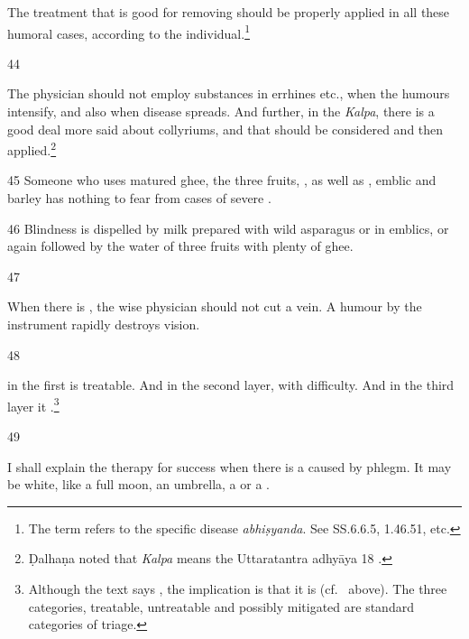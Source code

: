 \begin{translation}
    The treatment that is good for removing  should be 
    properly
    applied in all these humoral cases, according to the individual.\footnote{The term
     refers to the specific disease \emph{abhiṣyanda}.  See
    SS.6.6.5, 1.46.51, etc.}
    
    \item[44] %
    
    The physician should not employ substances in errhines etc., when the humours intensify, 
    and also when disease spreads.  And further, in the \emph{Kalpa}, there is a good deal 
    more 
    said about collyriums, and that should be considered and then applied.\footnote{Ḍalhaṇa 
    noted that \emph{Kalpa} means the Uttaratantra adhyāya 18 
    \citep[633\,ff]{vulgate}.}
    
    \item[45] 
    Someone who uses matured ghee, the three fruits, , 
    as well as
    , emblic and barley
    has nothing to fear from cases of severe .
    
    \item[46] Blindness is dispelled by milk prepared with wild asparagus or in
    emblics, or again  followed by the water of three
    fruits with plenty of ghee.
    
    \item[47]
    
    When there is , the wise physician should
    not cut a vein.  A humour  by the instrument rapidly
    destroys vision.
    
    \item[48] 
    
     in the first  is
    treatable.  And  in the second layer, with
    difficulty.
    And in the third layer it .\footnote{Although the text 
    says , the
implication is that it is  (cf.\ 
above). The three categories, treatable, untreatable and possibly mitigated are 
standard categories of triage.}
    
    
    \item [49]
    
    I shall explain the therapy for success when there is a 
    caused by phlegm.   It may be white, like a full moon, an umbrella, a
     or a .
    

\end{translation}
